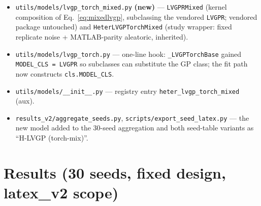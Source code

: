 \documentclass[11pt]{article}
\begin{document}
\begin{itemize}
\item \texttt{utils/models/lvgp\_torch\_mixed.py} \textbf{(new)} --- \texttt{LVGPRMixed}
(kernel composition of Eq.~\ref{eq:mixedlvgp}, subclassing the vendored \texttt{LVGPR};
vendored package untouched) and \texttt{HeterLVGPTorchMixed} (study wrapper: fixed replicate
noise + MATLAB-parity aleatoric, inherited).
\item \texttt{utils/models/lvgp\_torch.py} --- one-line hook: \texttt{\_LVGPTorchBase} gained
\texttt{MODEL\_CLS = LVGPR} so subclasses can substitute the GP class; the fit path now
constructs \texttt{cls.MODEL\_CLS}.
\item \texttt{utils/models/\_\_init\_\_.py} --- registry entry
\texttt{heter\_lvgp\_torch\_mixed} (aux).
\item \texttt{results\_v2/aggregate\_seeds.py}, \texttt{scripts/export\_seed\_latex.py} ---
the new model added to the 30-seed aggregation and both seed-table variants as
``H-LVGP (torch-mix)''.
\end{itemize}

\section{Results (30 seeds, fixed design, latex\_v2 scope)}
\end{document}
